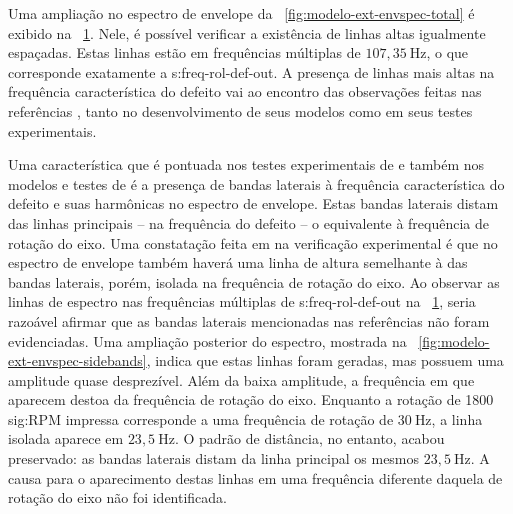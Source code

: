 \documentclass[12pt,oneside,english,brazil,lmodern,siglas,simbolos,cite=num]{ucsmonograph}
\begin{document}
	Uma ampliação no espectro de envelope da \figurename\ \ref{fig:modelo-ext-envspec-total} é exibido na \figurename\ \ref{fig:modelo-ext-envspec-600hz}.
	Nele, é possível verificar a existência de linhas altas igualmente espaçadas.
	Estas linhas estão em frequências múltiplas de $107,35\ \text{Hz}$, o que corresponde exatamente a \gls{s:freq-rol-def-out}.
	A presença de linhas mais altas na frequência característica do defeito vai ao encontro das observações feitas nas referências \cite{mcfadden:1984,sassi:2007,patil:2010,cong:2013}, tanto no desenvolvimento de seus modelos como em seus testes experimentais.

	\begin{figure}[ht]
		\label{fig:modelo-ext-envspec-600hz}
	\end{figure}

	Uma característica que é pontuada nos testes experimentais de \cite{mcfadden:1984} e também nos modelos e testes de \cite{sassi:2007,cong:2013} é a presença de bandas laterais à frequência característica do defeito e suas harmônicas no espectro de envelope.
	Estas bandas laterais distam das linhas principais -- na frequência do defeito -- o equivalente à frequência de rotação do eixo.
	Uma constatação feita em \cite{mcfadden:1984} na verificação experimental é que no espectro de envelope também haverá uma linha de altura semelhante à das bandas laterais, porém, isolada na frequência de rotação do eixo.
	Ao observar as linhas de espectro nas frequências múltiplas de \gls{s:freq-rol-def-out} na \figurename\ \ref{fig:modelo-ext-envspec-600hz}, seria razoável afirmar que as bandas laterais mencionadas nas referências não foram evidenciadas.
	Uma ampliação posterior do espectro, mostrada na \figurename\ \ref{fig:modelo-ext-envspec-sidebands}, indica que estas linhas foram geradas, mas possuem uma amplitude quase desprezível.
	Além da baixa amplitude, a frequência em que aparecem destoa da frequência de rotação do eixo.
	Enquanto a rotação de 1800 \gls{sig:RPM} impressa corresponde a uma frequência de rotação de $30\ \text{Hz}$, a linha isolada aparece em $23,5\ \text{Hz}$.
	O padrão de distância, no entanto, acabou preservado: as bandas laterais distam da linha principal os mesmos $23,5\ \text{Hz}$.
	A causa para o aparecimento destas linhas em uma frequência diferente daquela de rotação do eixo não foi identificada.
\end{document}
